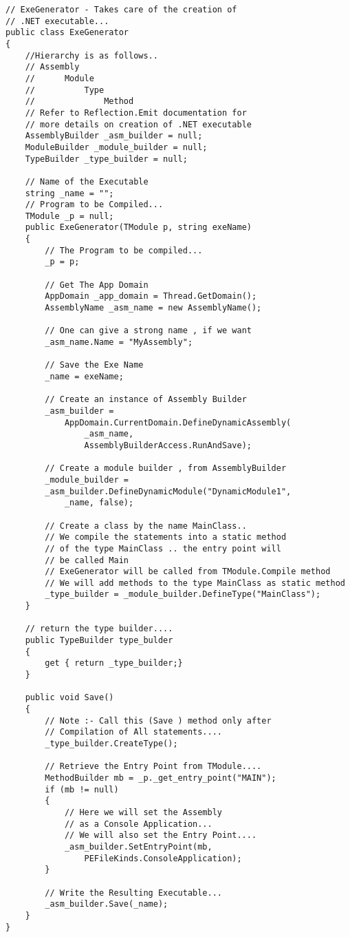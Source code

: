 \begin{lstlisting}
// ExeGenerator - Takes care of the creation of
// .NET executable...
public class ExeGenerator
{
	//Hierarchy is as follows..
	// Assembly
	// 		Module
	// 			Type
	// 				Method
	// Refer to Reflection.Emit documentation for
	// more details on creation of .NET executable
	AssemblyBuilder _asm_builder = null;
	ModuleBuilder _module_builder = null;
	TypeBuilder _type_builder = null;

	// Name of the Executable
	string _name = "";
	// Program to be Compiled...
	TModule _p = null;
	public ExeGenerator(TModule p, string exeName)
	{
		// The Program to be compiled...
		_p = p;
		
		// Get The App Domain
		AppDomain _app_domain = Thread.GetDomain();
		AssemblyName _asm_name = new AssemblyName();
		
		// One can give a strong name , if we want
		_asm_name.Name = "MyAssembly";
		
		// Save the Exe Name
		_name = exeName;

		// Create an instance of Assembly Builder
		_asm_builder = 
			AppDomain.CurrentDomain.DefineDynamicAssembly(
				_asm_name,
				AssemblyBuilderAccess.RunAndSave);
		
		// Create a module builder , from AssemblyBuilder
		_module_builder = 
		_asm_builder.DefineDynamicModule("DynamicModule1", 
			_name, false);

		// Create a class by the name MainClass..
		// We compile the statements into a static method
		// of the type MainClass .. the entry point will
		// be called Main
		// ExeGenerator will be called from TModule.Compile method
		// We will add methods to the type MainClass as static method
		_type_builder = _module_builder.DefineType("MainClass");
	}
	
	// return the type builder....
	public TypeBuilder type_bulder
	{
		get { return _type_builder;}
	}
	
	public void Save()
	{
		// Note :- Call this (Save ) method only after
		// Compilation of All statements....
		_type_builder.CreateType();
		
		// Retrieve the Entry Point from TModule....
		MethodBuilder mb = _p._get_entry_point("MAIN");
		if (mb != null)
		{
			// Here we will set the Assembly 
			// as a Console Application...
			// We will also set the Entry Point....
			_asm_builder.SetEntryPoint(mb, 
				PEFileKinds.ConsoleApplication);
		}
		
		// Write the Resulting Executable...
		_asm_builder.Save(_name);
	}
}
\end{lstlisting}

